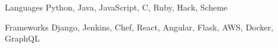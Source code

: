 
\begin{cvskills}
  \cvskill
    {Languages} %
    {Python, Java, JavaScript, C, Ruby, Hack, Scheme} %

  \cvskill
    {Frameworks} %
    {Django, Jenkins, Chef, React, Angular, Flask, AWS, Docker, GraphQL} %
\end{cvskills}
